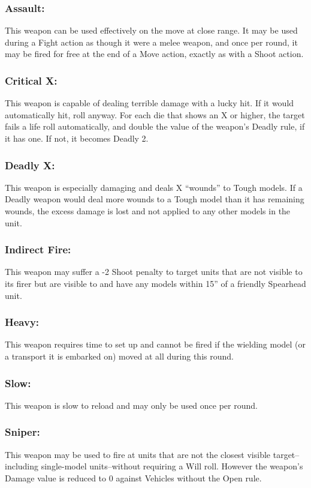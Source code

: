 \begin{multicols}{2}
\subsubsection*{Assault:} This weapon can be used effectively on the move at close range. It may be used during a Fight action as though it were a melee weapon, and once per round, it may be fired for free at the end of a Move action, exactly as with a Shoot action.

\subsubsection*{Critical X:} This weapon is capable of dealing terrible damage with a lucky hit. If it would automatically hit, roll anyway. For each die that shows an X or higher, the target fails a life roll automatically, and double the value of the weapon's Deadly rule, if it has one. If not, it becomes Deadly 2.

\subsubsection*{Deadly X:} This weapon is especially damaging and deals X ``wounds'' to Tough models. If a Deadly weapon would deal more wounds to a Tough model than it has remaining wounds, the excess damage is lost and not applied to any other models in the unit.

\subsubsection*{Indirect Fire:} This weapon may suffer a -2 Shoot penalty to target units that are not visible to its firer but are visible to and have any models within 15'' of a friendly Spearhead unit.

\subsubsection*{Heavy:} This weapon requires time to set up and cannot be fired if the wielding model (or a transport it is embarked on) moved at all during this round.

\subsubsection*{Slow:} This weapon is slow to reload and may only be used once per round.

\subsubsection*{Sniper:} This weapon may be used to fire at units that are not the closest visible target--including single-model units--without requiring a Will roll. However the weapon's Damage value is reduced to 0 against Vehicles without the Open rule.


\end{multicols}
